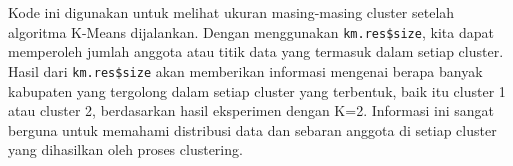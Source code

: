 \documentclass[
  oneside]{book}
\newenvironment{Shaded}{\begin{snugshade}}{\end{snugshade}}
\newcommand{\CommentTok}[1]{\textcolor[rgb]{0.56,0.35,0.01}{\textit{#1}}}
\newcommand{\NormalTok}[1]{#1}
\newcommand{\SpecialCharTok}[1]{\textcolor[rgb]{0.81,0.36,0.00}{\textbf{#1}}}
\begin{document}
\begin{Shaded}
\end{Shaded}

Kode ini digunakan untuk melihat ukuran masing-masing cluster setelah algoritma K-Means dijalankan. Dengan menggunakan \texttt{km.res\$size}, kita dapat memperoleh jumlah anggota atau titik data yang termasuk dalam setiap cluster. Hasil dari \texttt{km.res\$size} akan memberikan informasi mengenai berapa banyak kabupaten yang tergolong dalam setiap cluster yang terbentuk, baik itu cluster 1 atau cluster 2, berdasarkan hasil eksperimen dengan K=2. Informasi ini sangat berguna untuk memahami distribusi data dan sebaran anggota di setiap cluster yang dihasilkan oleh proses clustering.

\begin{Shaded}
\end{Shaded}
\end{document}
